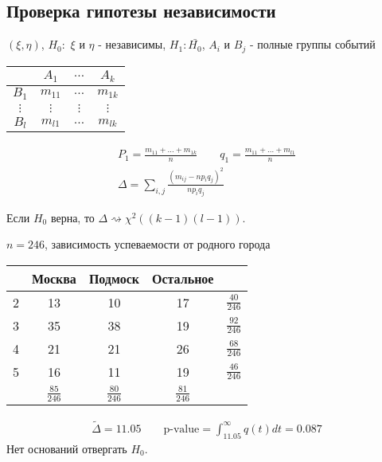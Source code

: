 \documentclass{article}
\begin{document}
\subsection{Проверка гипотезы независимости}
$(\xi, \eta)$, $H_0:$ $\xi$ и $\eta$ - независимы, $H_1:\bar{H_0}$, $A_i$ и $B_j$ - полные группы событий
\begin{center}
  \begin{tabular}{| c | c | c | c |}
    \hline 
    & $A_1$ & $\dots $ & $A_k$ \\ 
    \hline 
    $B_1$ & $m_{11}$ & $\dots $ & $m_{1k}$ \\ 
    \hline 
    $\vdots$ &$\vdots$ &$\vdots$ &$\vdots$ \\
    \hline 
    $B_l$ & $m_{l1}$ & $\dots $ & $m_{lk}$ \\ 
    \hline 
  \end{tabular}
\end{center}
\begin{gather*}
  P_1 = \frac{m_{11}+\dots +m_{1k}}{n} \qquad q_1 = \frac{m_{11}+\dots +m_{l1}}{n} \\ 
  \Delta = \sum_{i,j}^{}\frac{(m_{ij}-np_iq_j)^{2}}{np_iq_j}
\end{gather*}
\begin{theorem}
  Если $H_0$ верна, то $\Delta \rightsquigarrow \chi^{2}((k-1)(l-1))$.
\end{theorem}
\begin{eg}
  $n=246$, зависимость успеваемости от родного города
  \begin{center}
    \begin{tabular}{| c | c | c | c | c |}
      \hline 
      & Москва & Подмоск & Остальное & \\
      \hline 
      2 & 13 & 10 & 17 & $\frac{40}{246}$ \\ 
      \hline 
      3 & 35 & 38 & 19 & $\frac{92}{246}$ \\ 
      \hline 
      4 & 21 & 21 & 26 & $\frac{68}{246}$ \\ 
      \hline 
      5 & 16 & 11 & 19 & $\frac{46}{246}$ \\ 
      \hline 
        & $\frac{85}{246}$ & $\frac{80}{246}$ & $\frac{81}{246}$ & \\ 
      \hline
    \end{tabular}
  \end{center}
  \begin{gather*}
    \tilde{\Delta}=11.05 \qquad \text{p-value}=\int_{11.05}^{\infty}q(t)dt=0.087
  \end{gather*}
  Нет оснований отвергать $H_0$.
\end{eg}
\end{document}
